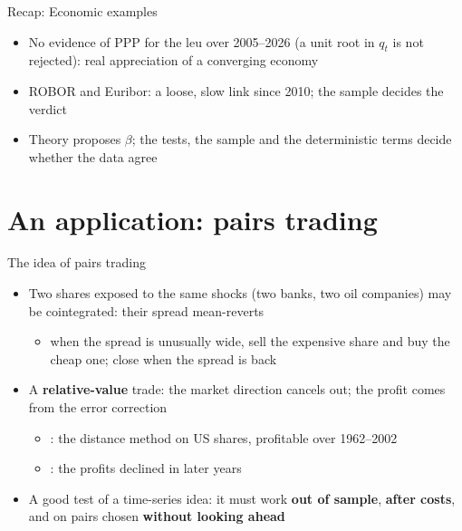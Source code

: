 \begin{frame}{Recap: Economic examples}
\itemsize{\small}
\begin{itemize}
    \item No evidence of PPP for the leu over 2005--2026 (a unit root in $q_t$ is not rejected): real appreciation of a converging economy
    \item ROBOR and Euribor: a loose, slow link since 2010; the sample decides the verdict
    \item Theory proposes $\beta$; the tests, the sample and the deterministic terms decide whether the data agree
\end{itemize}
\end{frame}


\section{An application: pairs trading}

\begin{frame}{The idea of pairs trading}
\itemsize{\small}
\begin{itemize}
    \item Two shares exposed to the same shocks (two banks, two oil companies) may be cointegrated: their spread mean-reverts
    \begin{itemize}
        \item when the spread is unusually wide, sell the expensive share and buy the cheap one; close when the spread is back
    \end{itemize}
    \item A \textbf{relative-value} trade: the market direction cancels out; the profit comes from the error correction
    \begin{itemize}
        \item {}: the distance method on US shares, profitable over 1962--2002
        \item {}: the profits declined in later years
    \end{itemize}
    \item A good test of a time-series idea: it must work \textbf{out of sample}, \textbf{after costs}, and on pairs chosen \textbf{without looking ahead}
\end{itemize}
\end{frame}

